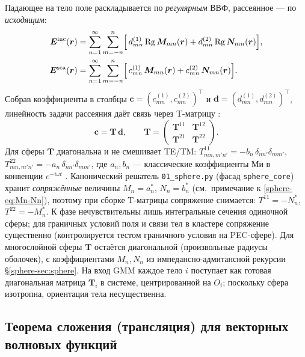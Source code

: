 \documentclass[11pt,a4paper]{article}
\begin{document}
Падающее на тело поле раскладывается по \emph{регулярным} ВВФ, рассеянное --- по \emph{исходящим}:
\begin{align}
\bm{E}^{\mathrm{inc}}(\bm{r}) &= \sum_{n=1}^{\infty}\sum_{m=-n}^{n}
\Bigl[\, d_{mn}^{(1)}\,\mathrm{Rg}\,\bm{M}_{mn}(\bm{r}) + d_{mn}^{(2)}\,\mathrm{Rg}\,\bm{N}_{mn}(\bm{r}) \Bigr],
\label{tmatrix-eq:tm-Einc}\\
\bm{E}^{\mathrm{sca}}(\bm{r}) &= \sum_{n=1}^{\infty}\sum_{m=-n}^{n}
\Bigl[\, c_{mn}^{(1)}\,\bm{M}_{mn}(\bm{r}) + c_{mn}^{(2)}\,\bm{N}_{mn}(\bm{r}) \Bigr].
\label{tmatrix-eq:tm-Esca}
\end{align}
Собрав коэффициенты в столбцы $\bm{c}=(c_{mn}^{(1)},c_{mn}^{(2)})^{\!\top}$ и $\bm{d}=(d_{mn}^{(1)},d_{mn}^{(2)})^{\!\top}$, линейность задачи рассеяния даёт связь через T-матрицу \cite{waterman1971,mishchenko2002}:
\begin{equation}
\bm{c} = \mathbf{T}\,\bm{d},
\qquad
\mathbf{T}=\begin{pmatrix} \mathbf{T}^{11} & \mathbf{T}^{12}\\[2pt] \mathbf{T}^{21} & \mathbf{T}^{22}\end{pmatrix}.
\label{tmatrix-eq:tm-Td}
\end{equation}
Для сферы $\mathbf{T}$ диагональна и не смешивает TE/TM: $T_{mn,m'n'}^{11}=-b_n\,\delta_{nn'}\delta_{mm'}$, $T_{mn,m'n'}^{22}=-a_n\,\delta_{nn'}\delta_{mm'}$, где $a_n,b_n$ --- классические коэффициенты Ми в конвенции $e^{-i\omega t}$ \cite{aden1951,bohren1983,mishchenko2002}. Канонический решатель \texttt{01\_sphere.py} (фасад \texttt{sphere\_core}) хранит \emph{сопряжённые} величины $M_n=a_n^{*}$, $N_n=b_n^{*}$ (см.\ примечание к \eqref{sphere-eq:Mn-Nn}), поэтому при сборке T-матрицы сопряжение снимается: $T^{11}=-N_n^{*}$, $T^{22}=-M_n^{*}$. К фазе нечувствительны лишь интегральные сечения одиночной сферы; для граничных условий поля и связи тел в кластере сопряжение существенно (контролируется тестом граничного условия на PEC-сфере). Для многослойной сферы $\mathbf{T}$ остаётся диагональной (произвольные радиусы оболочек), с коэффициентами $M_n,N_n$ из импедансно-адмитансной рекурсии \S\ref{sphere-sec:sphere}. На вход GMM каждое тело $i$ поступает как готовая диагональная матрица $\mathbf{T}_i$ в системе, центрированной на $O_i$; поскольку сфера изотропна, ориентация тела несущественна.

\subsection{Теорема сложения (трансляция) для векторных волновых функций}
\label{tmatrix-sec:tm-addition}
\end{document}
